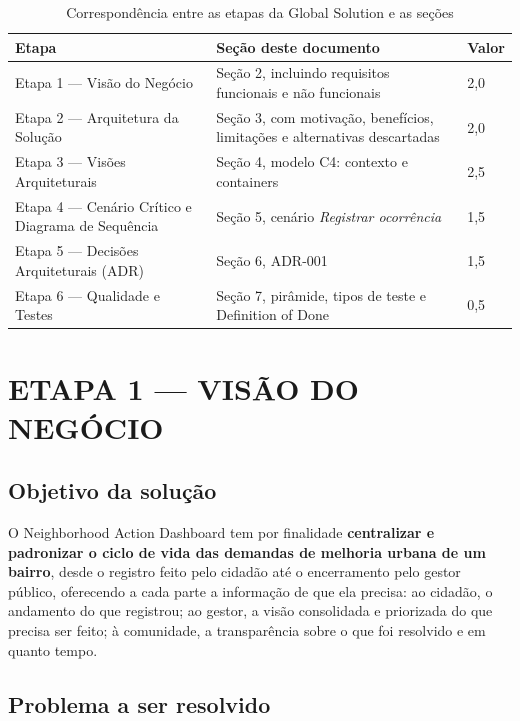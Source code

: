 \documentclass[12pt,a4paper,oneside]{article}
\newcommand{\fonte}[1]{\par\vspace{5pt}{\footnotesize\singlespacing Fonte: #1\par}}
\newcommand{\cab}[1]{\textbf{\footnotesize #1}}
\begin{document}
\begin{table}[H]
\centering
\caption{Correspondência entre as etapas da Global Solution e as seções}
\label{tab:guia}
{\small\singlespacing
\begin{tabularx}{\textwidth}{L{5.6cm} X L{2.0cm}}
\toprule
\cab{Etapa} & \cab{Seção deste documento} & \cab{Valor} \\
\midrule
Etapa 1 — Visão do Negócio & Seção 2, incluindo requisitos funcionais e não
funcionais & 2,0 \\
Etapa 2 — Arquitetura da Solução & Seção 3, com motivação, benefícios,
limitações e alternativas descartadas & 2,0 \\
Etapa 3 — Visões Arquiteturais & Seção 4, modelo C4: contexto e containers &
2,5 \\
Etapa 4 — Cenário Crítico e Diagrama de Sequência & Seção 5, cenário
\emph{Registrar ocorrência} & 1,5 \\
Etapa 5 — Decisões Arquiteturais (ADR) & Seção 6, ADR-001 & 1,5 \\
Etapa 6 — Qualidade e Testes & Seção 7, pirâmide, tipos de teste e Definition of
Done & 0,5 \\
\bottomrule
\end{tabularx}}
\fonte{elaborado pelos autores (2026), a partir do enunciado da GS2026.2.}
\end{table}

\section{ETAPA 1 — VISÃO DO NEGÓCIO}
\label{sec:etapa1}

\subsection{Objetivo da solução}

O Neighborhood Action Dashboard tem por finalidade \textbf{centralizar e
padronizar o ciclo de vida das demandas de melhoria urbana de um bairro}, desde
o registro feito pelo cidadão até o encerramento pelo gestor público, oferecendo
a cada parte a informação de que ela precisa: ao cidadão, o andamento do que
registrou; ao gestor, a visão consolidada e priorizada do que precisa ser feito;
à comunidade, a transparência sobre o que foi resolvido e em quanto tempo.

\subsection{Problema a ser resolvido}
\end{document}

